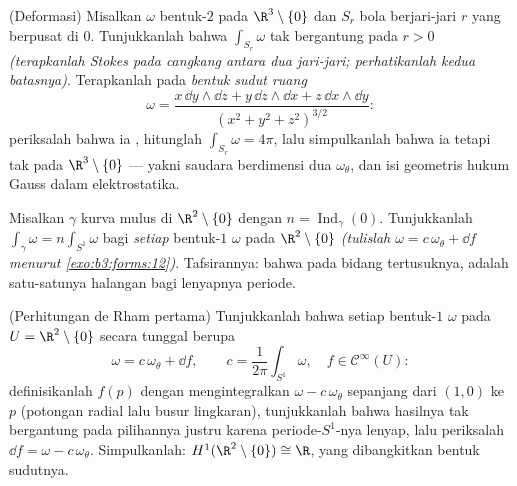 \begin{exercise}[$\star\star\star$]\label{exo:b3:forms:10}
(Deformasi) Misalkan $\omega$ bentuk-$2$ \emph{} pada
$\R^3\setminus\{0\}$ dan $S_r$ bola berjari-jari $r$
yang berpusat di $0$. Tunjukkanlah bahwa $\int_{S_r}\omega$ tak
bergantung pada $r > 0$ \emph{(terapkanlah Stokes pada cangkang antara
dua jari-jari; perhatikanlah kedua  batasnya)}. Terapkanlah pada
\emph{bentuk sudut ruang}
\[
\omega = \frac{x\,\dd y\wedge\dd z + y\,\dd z\wedge\dd x +
z\,\dd x\wedge\dd y}{(x^2 + y^2 + z^2)^{3/2}} :
\]
periksalah bahwa ia , hitunglah $\int_{S_r}\omega = 4\pi$, lalu
simpulkanlah bahwa ia  tetapi tak  pada
$\R^3\setminus\{0\}$ --- yakni saudara berdimensi dua
$\omega_\theta$, dan isi geometris hukum Gauss
dalam elektrostatika.
\end{exercise}

\begin{exercise}[$\star\star$]\label{exo:b3:forms:11}
Misalkan $\gamma$ kurva  mulus di
$\R^2\setminus\{0\}$ dengan $n = \operatorname{Ind}_\gamma(0)$.
Tunjukkanlah $\int_\gamma\omega = n\int_{S^1}\omega$ bagi
\emph{setiap} bentuk-$1$  $\omega$ pada
$\R^2\setminus\{0\}$ \emph{(tulislah $\omega = c\,\omega_\theta
+ \dd f$ menurut \cref{exo:b3:forms:12})}. Tafsirannya: bahwa pada
bidang tertusuknya,  adalah satu-satunya halangan
bagi lenyapnya periode.
\end{exercise}

\begin{exercise}[$\star\star\star$]\label{exo:b3:forms:12}
(Perhitungan de Rham pertama) Tunjukkanlah bahwa setiap bentuk-$1$ 
$\omega$ pada $U = \R^2\setminus\{0\}$ secara tunggal berupa
\[
\omega = c\,\omega_\theta + \dd f,
\qquad c = \frac1{2\pi}\int_{S^1}\omega,\quad f \in
\mathcal C^\infty(U) :
\]
definisikanlah $f(p)$ dengan mengintegralkan $\omega - c\,\omega_\theta$
sepanjang  dari $(1,0)$ ke $p$ (potongan radial lalu busur
lingkaran), tunjukkanlah bahwa hasilnya tak bergantung pada pilihannya
justru karena periode-$S^1$-nya lenyap, lalu periksalah $\dd
f = \omega - c\,\omega_\theta$. Simpulkanlah:
$H^1(\R^2\setminus\{0\}) \cong \R$, yang dibangkitkan bentuk
sudutnya.
\end{exercise}

